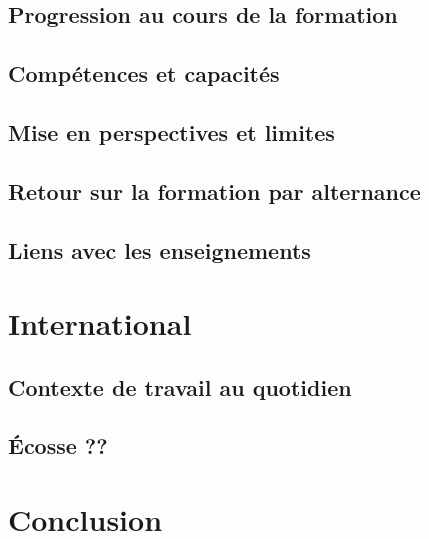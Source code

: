 \documentclass[a4paper,12pt]{report}
\begin{document}
\section{Progression au cours de la formation}
\section{Compétences et capacités}
\section{Mise en perspectives et limites}
\section{Retour sur la formation par alternance}
\section{Liens avec les enseignements}

\chapter{International}
\section{Contexte de travail au quotidien}
\section{Écosse ??}

\chapter{Conclusion}
\end{document}
